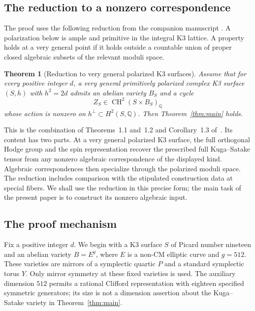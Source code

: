 \documentclass[11pt]{article}
\numberwithin{equation}{section}
\newtheorem{theorem}{Theorem}[section]
\theoremstyle{definition}
\theoremstyle{remark}
\begin{document}
\subsection{The reduction to a nonzero correspondence}

The proof uses the following reduction from the companion manuscript
\cite{R}.  A polarization below is ample and primitive in the
integral K3 lattice.  A property holds at a very general point if it
holds outside a countable union of proper closed algebraic subsets
of the relevant moduli space.

\begin{theorem}[Reduction to very general polarized K3 surfaces]
\label{thm:reduction}
Assume that for every positive integer $d$, a very general
primitively polarized complex K3 surface $(S,h)$ with $h^2=2d$
admits an abelian variety $B_S$ and a cycle
\[
       Z_S\in\operatorname{CH}^2(S\times B_S)_\mathbb Q
\]
whose action is nonzero on $h^\perp\subset H^2(S,\mathbb Q)$.
Then Theorem~\ref{thm:main} holds.
\end{theorem}

This is the combination of Theorems~1.1 and~1.2 and
Corollary~1.3 of~\cite{R}.  Its content has two parts.  At a very
general polarized K3 surface, the full orthogonal Hodge group and
the spin representation recover the prescribed full Kuga--Satake
tensor from any nonzero algebraic correspondence of the displayed
kind.  Algebraic correspondences then specialize through the
polarized moduli space.  The reduction includes comparison with
the stipulated construction data at special fibers.  We shall use
the reduction in this precise form; the main task of the present
paper is to construct its nonzero algebraic input.

\subsection{The proof mechanism}

Fix a positive integer $d$.  We begin with a K3 surface $S$ of
Picard number nineteen and an abelian variety $B=E^g$, where $E$ is
a non-CM elliptic curve and $g=512$.  These varieties are mirrors
of a symplectic quartic $P$ and a standard symplectic torus $Y$.
Only mirror symmetry at these fixed varieties is used.  The
auxiliary dimension $512$ permits a rational Clifford
representation with eighteen specified symmetric generators; its
size is not a dimension assertion about the Kuga--Satake variety
in Theorem~\ref{thm:main}.
\end{document}
